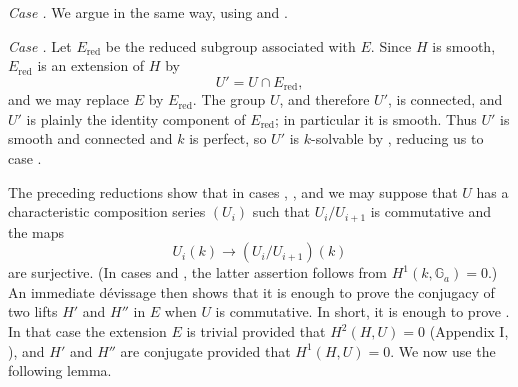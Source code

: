 \medskip\noindent\textit{Case .}\quad
We argue in the same way, using  and .

\medskip\noindent\textit{Case .}\quad
Let \(E_{\mathrm{red}}\) be the reduced subgroup associated with
\(E\).  Since \(H\) is smooth, \(E_{\mathrm{red}}\) is an
extension of \(H\) by
\[
  U'=U\cap E_{\mathrm{red}},
\]
and we may replace \(E\) by \(E_{\mathrm{red}}\).  The group \(U\),
and therefore \(U'\), is connected, and \(U'\) is plainly the
identity component of \(E_{\mathrm{red}}\); in particular it is
smooth.  Thus \(U'\) is smooth and connected and \(k\) is
perfect, so \(U'\) is \(k\)-solvable by , reducing us to
case .

The preceding reductions show that in cases , , and  we
may suppose that \(U\) has a characteristic composition series
\((U_i)\) such that \(U_i/U_{i+1}\) is commutative and the maps
\[
  U_i(k)\longrightarrow (U_i/U_{i+1})(k)
\]
are surjective.  (In cases  and , the latter assertion
follows from \(H^1(k,\mathbb G_a)=0\).)  An immediate dévissage
then shows that it is enough to prove the conjugacy of two lifts
\(H'\) and \(H''\) in \(E\) when \(U\) is commutative.  In short,
it is enough to prove .  In that case the extension \(E\)
is trivial provided that \(H^2(H,U)=0\) (Appendix I, ), and
\(H'\) and \(H''\) are conjugate provided that \(H^1(H,U)=0\).
We now use the following lemma.



